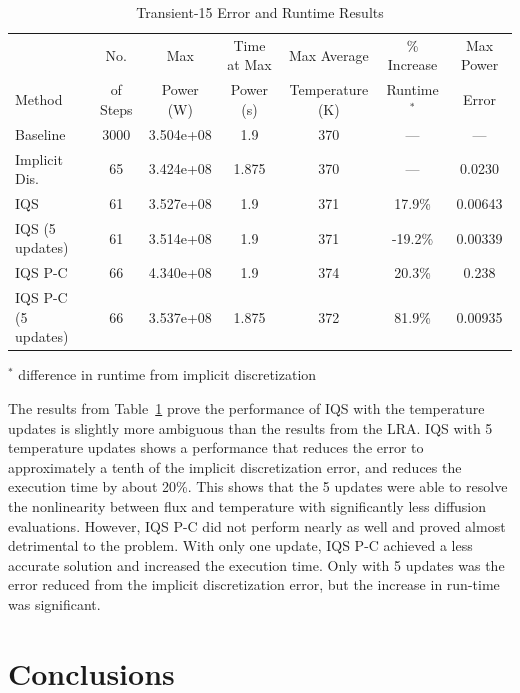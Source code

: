 \documentclass{anstrans}
\newcommand{\tbl}[1]{Table~\ref{#1}}                     %
\begin{document}
\begin{table}[htb]
\begin{center}
\begin{tabular}{|l|cccccc|}
\hline
 & No.	& Max &	Time at Max &	Max Average &	\% Increase &	Max Power \\
Method & of Steps &	Power (W) &	Power (s) &	Temperature (K) & Runtime$^*$ & Error \\
\hline
Baseline 			& 3000 	& 3.504e+08 & 1.9 	& 370 &	---		&	---		\\
Implicit Dis. 		& 65 	& 3.424e+08 & 1.875 & 370 &	---		&	0.0230 	\\
IQS 				& 61 	& 3.527e+08 & 1.9 	& 371 &	 17.9\%	&	0.00643 \\
IQS (5 updates) 	& 61 	& 3.514e+08 & 1.9 	& 371 &	-19.2\%	&	0.00339	\\
IQS P-C 			& 66 	& 4.340e+08 & 1.9 	& 374 &	 20.3\%	&	0.238	\\
IQS P-C (5 updates) & 66 	& 3.537e+08 & 1.875 & 372 &  81.9\%	&	0.00935	\\
\hline
\end{tabular}
\end{center}
\vspace{-3mm}
$^*$ difference in runtime from implicit discretization 
\caption{Transient-15 Error and Runtime Results}
\label{tab:tran15}
\end{table}

The results from \tbl{tab:tran15} prove the performance of IQS with the temperature updates is slightly more ambiguous than the results from the LRA.  IQS with 5 temperature updates shows a performance that reduces the error to approximately a tenth of the implicit discretization error, and reduces the execution time by about 20\%.  This shows that the 5 updates were able to resolve the nonlinearity between flux and temperature with significantly less diffusion evaluations.  However, IQS P-C did not perform nearly as well and proved almost detrimental to the problem.  With only one update, IQS P-C achieved a less accurate solution and increased the execution time.  Only with 5 updates was the error reduced from the implicit discretization error, but the increase in run-time was significant. \\


\section{Conclusions}
\end{document}
